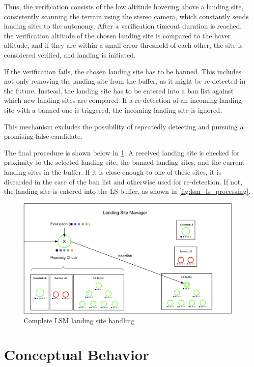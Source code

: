 Thus, the verification consists of the low altitude hovering above a landing site, consistently scanning the terrain using the stereo camera, which constantly sends landing sites to the autonomy. After a verification timeout duration is reached, the verification altitude of the chosen landing site is compared to the hover altitude, and if they are within a small error threshold of each other, the site is considered verified, and landing is initiated.

If the verification fails, the chosen landing site has to be banned. This includes not only removing the landing site from the buffer, as it might be re-detected in the future. Instead, the landing site has to be entered into a ban list against which new landing sites are compared. If a re-detection of an incoming landing site with a banned one is triggered, the incoming landing site is ignored. 

This mechanism excludes the possibility of repeatedly detecting and pursuing a promising false candidate.

The final procedure is shown below in \cref{fig:lsm_complete}. A received landing site is checked for proximity to the selected landing site, the banned landing sites, and the current landing sites in the buffer. If it is close enough to one of these sites, it is discarded in the case of the ban list and otherwise used for re-detection. If not, the landing site is entered into the LS buffer, as shown in \cref{fig:lsm_ls_processing}.

\begin{figure}[h]
\centering
\includegraphics[scale=0.2]{images/autonomous_landing/lsm_complete.png}
\caption{Complete LSM landing site handling}
\label{fig:lsm_complete}
\end{figure}

\section{Conceptual Behavior}\label{sec:concept_beh}

